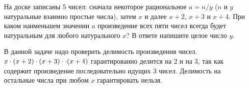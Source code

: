 
На доске записаны 5 чисел: сначала некоторое рациональное $a=n/y$ ($n$ и $y$ натуральные взаимно простые числа),
 затем $x$ и далее $x+2$, $x+3$ и $x+4$. При каком наименьшем значении $a$ произведение всех 
 пяти чисел всегда будет натуральным для любого натурального $x$? В ответе напишите целое число $y$.

\soultionSection

В данной задаче надо проверить делимость произведения чисел. $x\cdot (x + 2)\cdot(x + 3) \cdot \linebreak \cdot (x + 4)$ гарантированно делится на $2$ и на $3$, так как содержит произведение последовательно идущих $3$ чисел. Делимость на остальные числа при любом $x$ гарантировать нельзя.

